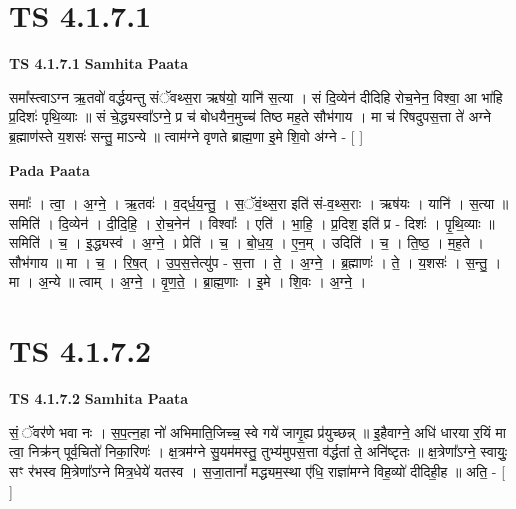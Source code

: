 \documentclass[17pt]{extarticle}
\begin{document}
\section*{ TS 4.1.7.1 }

\textbf{TS 4.1.7.1 } \newline
\textbf{Samhita Paata} \newline

समा᳚स्त्वाऽग्न ऋ॒तवो॑ वर्द्धयन्तु संॅवथ्स॒रा ऋष॑यो॒ यानि॑ स॒त्या । सं दि॒व्येन॑ दीदिहि रोच॒नेन॒ विश्वा॒ आ भा॑हि प्र॒दिशः॑ पृथि॒व्याः ॥ सं चे॒द्ध्यस्वा᳚ऽग्ने॒ प्र च॑ बोधयैन॒मुच्च॑ तिष्ठ मह॒ते सौभ॑गाय । मा च॑ रिषदुपस॒त्ता ते॑ अग्ने ब्र॒ह्माण॑स्ते य॒शसः॑ सन्तु॒ माऽन्ये ॥ त्वाम॑ग्ने वृणते ब्राह्म॒णा इ॒मे शि॒वो अ॑ग्ने - [  ] \newline

\textbf{Pada Paata} \newline

समाः᳚ । त्वा॒ । अ॒ग्ने॒ । ऋ॒तवः॑ । व॒द्‌र्ध॒य॒न्तु॒ । स॒ॅवं॒थ्स॒रा इति॑ सं-व॒थ्स॒राः । ऋष॑यः । यानि॑ । स॒त्या ॥ समिति॑ । दि॒व्येन॑ । दी॒दि॒हि॒ । रो॒च॒नेन॑ । विश्वाः᳚ । एति॑ । भा॒हि॒ । प्र॒दिश॒ इति॑ प्र - दिशः॑ । पृ॒थि॒व्याः ॥ समिति॑ । च॒ । इ॒द्ध्यस्व॑ । अ॒ग्ने॒ । प्रेति॑ । च॒ । बो॒ध॒य॒ । ए॒न॒म् । उदिति॑ । च॒ । ति॒ष्ठ॒ । म॒ह॒ते । सौभ॑गाय ॥ मा । च॒ । रि॒ष॒त् । उ॒प॒स॒त्तेत्यु॑प - स॒त्ता । ते॒ । अ॒ग्ने॒ । ब्र॒ह्माणः॑ । ते॒ । य॒शसः॑ । स॒न्तु॒ । मा । अ॒न्ये ॥ त्वाम् । अ॒ग्ने॒ । वृ॒ण॒ते॒ । ब्रा॒ह्म॒णाः । इ॒मे । शि॒वः । अ॒ग्ने॒ ।  \newline




\section*{ TS 4.1.7.2 }

\textbf{TS 4.1.7.2 } \newline
\textbf{Samhita Paata} \newline

सं॒ ॅवर॑णे भवा नः । स॒प॒त्न॒हा नो॑ अभिमाति॒जिच्च॒ स्वे गये॑ जागृ॒ह्य प्र॑युच्छन्न् ॥ इ॒हैवाग्ने॒ अधि॑ धारया र॒यिं मा त्वा॒ निक्र॑न् पूर्व॒चितो॑ निका॒रिणः॑ । क्ष॒त्रम॑ग्ने सु॒यम॑मस्तु॒ तुभ्य॑मुपस॒त्ता व॑र्द्धतां ते॒ अनि॑ष्टृतः ॥ क्ष॒त्रेणा᳚ऽग्ने॒ स्वायुः॒ सꣳ र॑भस्व मि॒त्रेणा᳚ऽग्ने मित्र॒धेये॑ यतस्व । स॒जा॒तानां᳚ मद्ध्यम॒स्था ए॑धि॒ राज्ञा॑मग्ने विह॒व्यो॑ दीदिही॒ह ॥ अति॒ - [  ] \newline
\end{document}
